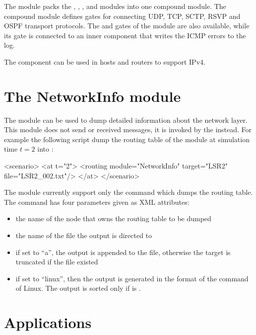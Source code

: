 The  module packs the , ,
, and  modules into one compound module.
The compound module defines gates for connecting UDP, TCP, SCTP, RSVP and
OSPF transport protocols. The  and  gates of the
 module are also available, while its  gate
is connected to an inner  component that writes
the ICMP errors to the log.

The component can be used in hosts and routers to support IPv4.

\section{The NetworkInfo module}

The  module can be used to dump detailed information
about the network layer. This module does not send or received messages,
it is invoked by the  instead. For example
the following  script dump the routing table
of the  module at simulation time $t=2$ into :
\begin{filelisting}
<scenario>
  <at t="2">
    <routing module="NetworkInfo" target="LSR2" file="LSR2_002.txt"/>
  </at>
</scenario>
\end{filelisting}

The module currently support only the  command which dumps
the routing table. The command has four parameters given as XML attributes:
\begin{itemize}
  \item {} the name of the node that owns the routing table to be dumped
  \item {} the name of the file the output is directed to
  \item {} if set to ``a'', the output is appended to the file,
                   otherwise the target is truncated if the file existed
  \item {} if set to ``linux'', then the output is generated
                     in the format of the  command of Linux.
                     The output is sorted only if  is
                     .
\end{itemize}

\section{Applications}


